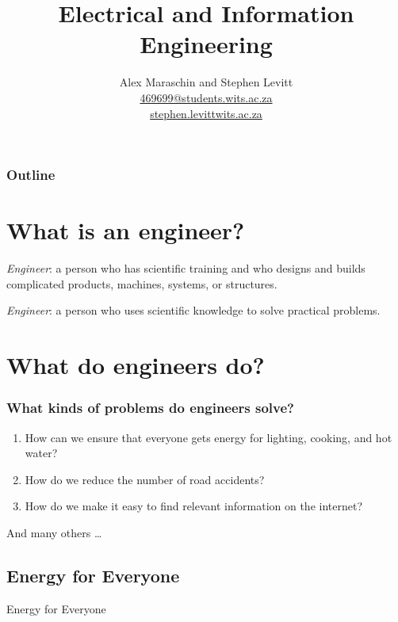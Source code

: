 \documentclass{beamer}
\title{Electrical and Information Engineering}
\author[]{Alex Maraschin and Stephen Levitt\\ \vspace{3mm}
\href{mailto:469699@students.wits.ac.za}{469699@{\small\MVAt}students.wits.ac.za}\\
\href{mailto:stephen.levitt@wits.ac.za}{stephen.levitt{\small\MVAt}wits.ac.za}}
\begin{document}
\titleslide

\begin{frame}
    \frametitle{Outline}
    \tableofcontents[hideallsubsections]
\end{frame}


\section{What is an engineer?}


\begin{frame}
\begin{unsignedquote}
 \textit{Engineer}: a person who has scientific training and who designs and builds complicated products, machines, systems, or structures.
\end{unsignedquote}

\vspace{5mm}

\begin{unsignedquote}
 \textit{Engineer}:  a person who uses scientific knowledge to \alert{solve practical problems}.
\end{unsignedquote}
\end{frame}

\section{What do engineers do?}
\begin{frame}
\frametitle{What kinds of problems do engineers solve?}
  \begin{enumerate}
    \item How can we ensure that everyone gets energy for lighting, cooking, and hot water?
    \item How do we reduce the number of road accidents?
    \item How do we make it easy to find relevant information on the internet?  
  \end{enumerate}

  And many others \ldots

\end{frame}

\subsection{Energy for Everyone}
\begin{frame}[plain,c]
\begin{center}
\Huge Energy for Everyone
\end{center}
\end{frame}
\end{document}
